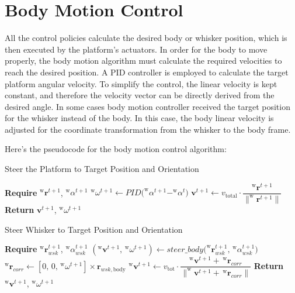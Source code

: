 \section{Body Motion Control}
All the control policies calculate the desired body or whisker position, which is then executed by the platform's actuators.
In order for the body to move properly, the body motion algorithm must calculate the required velocities to reach the desired position.
A PID controller is employed to calculate the target platform angular velocity.
To simplify the control, the linear velocity is kept constant, and therefore the velocity vector can be directly derived from the desired angle.
In some cases body motion controller received the target position for the whisker instead of the body.
In this case, the body linear velocity is adjusted for the coordinate transformation from the whisker to the body frame.

Here's the pseudocode for the body motion control algorithm:

\begin{algorithm}[htb]
    \caption{Steer the Platform to Target Position and Orientation}
    \begin{algorithmic}
        \State \textbf{Require} \(^{\mathrm{w}}\boldsymbol{r}^{t+1}\), \(^{\mathrm{w}}\alpha^{t+1}\)
        \State \(^{\mathrm{w}}\omega^{t+1} \gets PID\Big(^{\mathrm{w}}\alpha^{t+1} - ^{\mathrm{w}}\alpha^{t}\Big)\)
        \State \(\boldsymbol{v}^{t+1} \gets v_{\textrm{total}} \cdot \dfrac{^{\mathrm{w}}\boldsymbol{r}^{t+1}}{\|^{\mathrm{w}}\boldsymbol{r}^{t+1}\|}\)
        \State \textbf{Return} \(\boldsymbol{v}^{t+1}\), \(^{\mathrm{w}}\omega^{t+1}\)
    \end{algorithmic}
    \label{alg:steer_platform}
\end{algorithm}

\begin{algorithm}[htb]
    \caption{Steer Whisker to Target Position and Orientation}
    \begin{algorithmic}
        \State \textbf{Require} \(^{\mathrm{w}}\boldsymbol{r}_{wsk}^{t+1}\), \(^{\mathrm{w}}\alpha_{wsk}^{t+1}\)
        \State \((^{\mathrm{w}}\boldsymbol{v}^{t+1},\, ^{\mathrm{w}}\omega^{t+1}) \gets steer\_body\big(^{\mathrm{w}}\boldsymbol{r}_{wsk}^{t+1},\, ^{\mathrm{w}}\alpha_{wsk}^{t+1}\big)\)
        \State \(^{\mathrm{w}}\boldsymbol{r}_{corr} \gets [0,\,0,\,^{\mathrm{w}}\omega^{t+1}] \times \boldsymbol{r}_{wsk, \textrm{body}}\) 
        \State \(^{\mathrm{w}}\boldsymbol{v}^{t+1} \gets v_{\textrm{tot}} \cdot \dfrac{^{\mathrm{w}}\boldsymbol{v}^{t+1} + \,^{\mathrm{w}}\boldsymbol{r}_{corr}}{\|^{\mathrm{w}}\boldsymbol{v}^{t+1} + \,^{\mathrm{w}}\boldsymbol{r}_{corr}\|}\)
        \State \textbf{Return} \(^{\mathrm{w}}\boldsymbol{v}^{t+1}\), \(^{\mathrm{w}}\omega^{t+1}\)
    \end{algorithmic}
    \label{alg:steer_whisker}
\end{algorithm}


